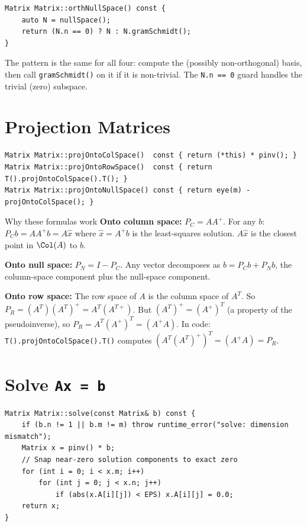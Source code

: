 \documentclass[12pt, a4paper]{article}
\newcommand{\code}[1]{\texttt{\small#1}}
\newcommand{\fn}[1]{\texttt{\small\color{funcgreen}#1}}
\begin{document}
\begin{lstlisting}
Matrix Matrix::orthNullSpace() const {
    auto N = nullSpace();
    return (N.n == 0) ? N : N.gramSchmidt();
}
\end{lstlisting}

The pattern is the same for all four: compute the (possibly non-orthogonal)
basis, then call \fn{gramSchmidt()} on it if it is non-trivial.  The
\code{N.n == 0} guard handles the trivial (zero) subspace.

\section{Projection Matrices}

\begin{lstlisting}
Matrix Matrix::projOntoColSpace()  const { return (*this) * pinv(); }
Matrix Matrix::projOntoRowSpace()  const { return T().projOntoColSpace().T(); }
Matrix Matrix::projOntoNullSpace() const { return eye(m) - projOntoColSpace(); }
\end{lstlisting}

\begin{flowbox}{Why these formulas work}
\textbf{Onto column space:} $P_C = A A^+$.  For any $b$: $P_C b = A A^+ b = A
\hat{x}$ where $\hat{x} = A^+ b$ is the least-squares solution.  $A\hat{x}$
is the closest point in $\Col(A)$ to $b$.

\textbf{Onto null space:} $P_N = I - P_C$.  Any vector decomposes as
$b = P_C b + P_N b$, the column-space component plus the null-space component.

\textbf{Onto row space:} The row space of $A$ is the column space of $A^T$.
So $P_R = (A^T)(A^T)^+ = A^T (A^{T+})$. But $(A^T)^+ = (A^+)^T$ (a property
of the pseudoinverse), so $P_R = A^T (A^+)^T = (A^+ A)$.  In code:
\code{T().projOntoColSpace().T()} computes $(A^T (A^T)^+)^T = (A^+ A) = P_R$.
\end{flowbox}

\section{Solve \texttt{Ax = b}}

\begin{lstlisting}
Matrix Matrix::solve(const Matrix& b) const {
    if (b.n != 1 || b.m != m) throw runtime_error("solve: dimension mismatch");
    Matrix x = pinv() * b;
    // Snap near-zero solution components to exact zero
    for (int i = 0; i < x.m; i++)
        for (int j = 0; j < x.n; j++)
            if (abs(x.A[i][j]) < EPS) x.A[i][j] = 0.0;
    return x;
}
\end{lstlisting}
\end{document}

